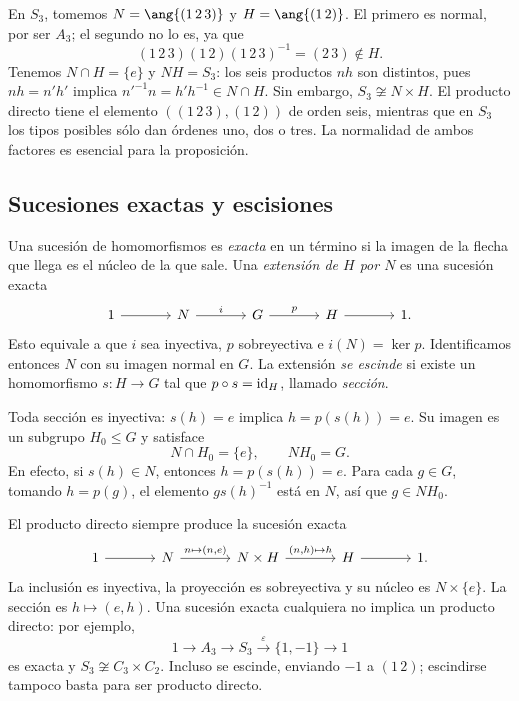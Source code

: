 \begin{ejem}
En $S_3$, tomemos $N=\ang{(1\,2\,3)}$ y $H=\ang{(1\,2)}$. El primero es normal, por ser $A_3$; el segundo no lo es, ya que
\[
(1\,2\,3)(1\,2)(1\,2\,3)^{-1}=(2\,3)\notin H.
\]
Tenemos $N\cap H=\{e\}$ y $NH=S_3$: los seis productos $nh$ son distintos, pues $nh=n'h'$ implica $n'^{-1}n=h'h^{-1}\in N\cap H$. Sin embargo, $S_3\not\cong N\times H$. El producto directo tiene el elemento $((1\,2\,3),(1\,2))$ de orden seis, mientras que en $S_3$ los tipos posibles sólo dan órdenes uno, dos o tres. La normalidad de ambos factores es esencial para la proposición.
\end{ejem}

\subsection{Sucesiones exactas y escisiones}\label{tema:10-1-2}
\begin{defi}
Una sucesión de homomorfismos es \emph{exacta} en un término si la imagen de la flecha que llega es el núcleo de la que sale. Una \emph{extensión de $H$ por $N$} es una sucesión exacta
\[
\begin{tikzcd}[column sep=large]
1\arrow[r]&N\arrow[r,"i"]&G\arrow[r,"p"]&H\arrow[r]&1.
\end{tikzcd}
\]
Esto equivale a que $i$ sea inyectiva, $p$ sobreyectiva e $i(N)=\ker p$. Identificamos entonces $N$ con su imagen normal en $G$. La extensión \emph{se escinde} si existe un homomorfismo $s:H\to G$ tal que $p\circ s=\operatorname{id}_H$, llamado \emph{sección}.
\end{defi}
Toda sección es inyectiva: $s(h)=e$ implica $h=p(s(h))=e$. Su imagen es un subgrupo $H_0\le G$ y satisface
\[
N\cap H_0=\{e\},\qquad NH_0=G.
\]
En efecto, si $s(h)\in N$, entonces $h=p(s(h))=e$. Para cada $g\in G$, tomando $h=p(g)$, el elemento $gs(h)^{-1}$ está en $N$, así que $g\in NH_0$.

El producto directo siempre produce la sucesión exacta
\[
\begin{tikzcd}[column sep=large]
1\arrow[r]&N\arrow[r,"{n\mapsto(n,e)}"]&N\times H\arrow[r,"{(n,h)\mapsto h}"]&H\arrow[r]&1.
\end{tikzcd}
\]
La inclusión es inyectiva, la proyección es sobreyectiva y su núcleo es $N\times\{e\}$. La sección es $h\mapsto(e,h)$. Una sucesión exacta cualquiera no implica un producto directo: por ejemplo,
\[
1\longrightarrow A_3\longrightarrow S_3
\overset{\varepsilon}{\longrightarrow}\{1,-1\}\longrightarrow1
\]
es exacta y $S_3\not\cong C_3\times C_2$. Incluso se escinde, enviando $-1$ a $(1\,2)$; escindirse tampoco basta para ser producto directo.

